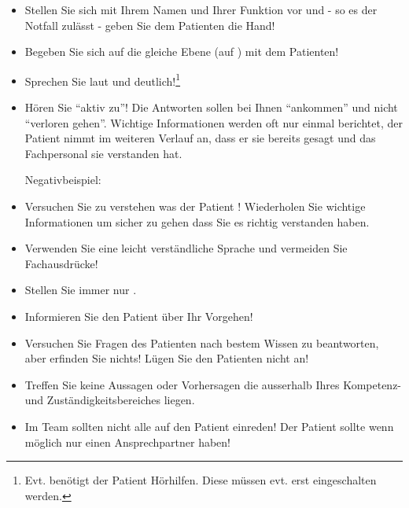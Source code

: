 \begin{itemize}
    \item Stellen Sie sich mit Ihrem Namen und Ihrer Funktion vor und - so es
    der Notfall zulässt - geben Sie dem Patienten die Hand!
    \item Begeben Sie sich auf die gleiche Ebene (auf ) mit dem
    Patienten!
    \item Sprechen Sie laut und deutlich!\footnote{Evt. benötigt der
    Patient Hörhilfen. Diese müssen evt. erst eingeschalten werden.}
    \item Hören Sie "`aktiv zu"'! Die Antworten sollen bei Ihnen "`ankommen"'
    und nicht "`verloren gehen"'. Wichtige Informationen werden oft nur einmal
    berichtet, der Patient nimmt im weiteren Verlauf an, dass er sie bereits
    gesagt und das Fachpersonal sie verstanden hat.
    
    Negativbeispiel: 
    \item Versuchen Sie zu verstehen was
    der Patient ! Wiederholen Sie wichtige Informationen um sicher zu
    gehen dass Sie es richtig verstanden haben.
    \item Verwenden Sie eine leicht verständliche Sprache und vermeiden Sie Fachausdrücke!
    \item Stellen Sie immer nur .
    \item Informieren Sie den Patient über Ihr Vorgehen!
    \item Versuchen Sie Fragen des Patienten nach bestem Wissen zu
    beantworten, aber erfinden Sie nichts! Lügen Sie den Patienten nicht an!
    \item Treffen Sie keine Aussagen oder Vorhersagen die ausserhalb Ihres
    Kompetenz- und Zuständigkeitsbereiches liegen.
    \item Im Team sollten nicht alle auf den Patient einreden! Der
    Patient sollte wenn möglich nur einen Ansprechpartner haben!
\end{itemize}

